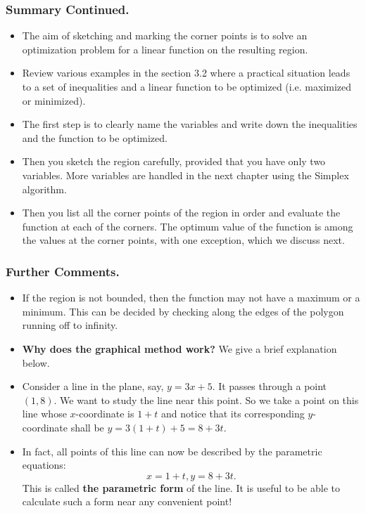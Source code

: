 
\begin{frame}%
 \frametitle{Summary Continued.}
  \begin{itemize}%

\item
The aim of sketching and marking the corner points is to solve an
optimization problem for a linear function on the resulting region.
\item Review various examples in the section 3.2 where a practical
situation leads to a set of inequalities and a linear function to
be optimized (i.e. maximized or minimized). 
\item The first step is to clearly name the variables and write
down the inequalities and the function to be optimized.
\item
Then you sketch the region carefully, provided that you have
only two variables.
More variables are handled in the next chapter using the Simplex
algorithm.
\item 
Then you list all the corner points of the region in order and
evaluate the function at each of the corners. 
The optimum value of the function is among the values at
the corner points, with one exception, which we discuss next.

\end{itemize}
 
\end{frame}


\begin{frame}%
 \frametitle{Further Comments.}
  \begin{itemize}%
\item If the region is not bounded, then the function may not
have a maximum or a minimum. This can be decided by checking
along the edges of the polygon running off to infinity.

\item {\bf Why does the graphical method work?}
We give a brief explanation below.
\item {}
Consider a line in the plane, say, $y = 3x+5$. 
It passes through a point $(1,8)$.
We want to study the line  near this point. 
So we  take a point on this line whose $x$-coordinate is $1+t$
and notice that its corresponding $y$-coordinate shall be 
$y=3(1+t)+5 = 8+3t$.
\item 
In fact, all points of this line can now be described
by the parametric equations:
$$x = 1+t,y = 8+3t.$$
This is called {\bf the parametric form }of the line.
It is useful to be able to calculate such a form 
near any convenient point!



\end{itemize}
 
\end{frame}

